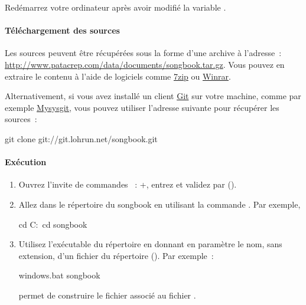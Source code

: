 Redémarrez votre ordinateur après avoir modifié la variable
.


\paragraph{Téléchargement des sources}

Les sources peuvent être récupérées sous la forme d'une archive
 à l'adresse~:
\url{http://www.patacrep.com/data/documents/songbook.tar.gz}. Vous
pouvez en extraire le contenu à l'aide de logiciels comme
\href{http://www.7-zip.org/}{7zip} ou
\href{http://www.win-rar.com/}{Winrar}.

Alternativement, si vous avez installé un client
\href{http://git-scm.com/}{Git} sur votre machine, comme par exemple
\href{http://code.google.com/p/msysgit/}{Mysysgit}, vous pouvez
utiliser l'adresse suivante pour récupérer les sources~:

\begin{unix}
  git clone git://git.lohrun.net/songbook.git
\end{unix}

\paragraph{Exécution}

\begin{enumerate}
\item Ouvrez l'invite de commandes \windows~: +, entrez
   et validez par 
  ().
\item Allez dans le répertoire du songbook en utilisant la commande .
Par exemple,
  \begin{unix}
    cd C:\
    cd songbook
  \end{unix}
\item Utilisez l'exécutable  du répertoire
   en donnant en paramètre le nom, sans extension,
  d'un fichier \ext{sb} du répertoire \directory{books}
  (). Par exemple~:
  \begin{unix}
    windows\make.bat songbook
  \end{unix}
  permet de construire le fichier  associé au
  fichier \file{books/songbook.sb}.
\end{enumerate}

